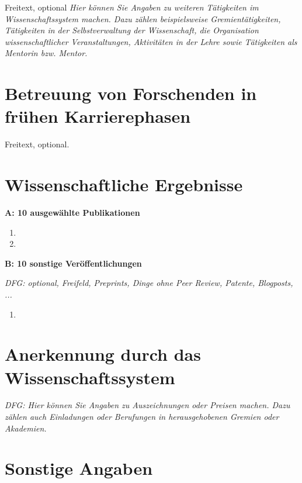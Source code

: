 \documentclass[a4paper,11pt]{article}
\begin{document}
Freitext, optional
\emph{Hier können Sie Angaben zu weiteren Tätigkeiten im
  Wissenschaftssystem machen. Dazu zählen beispielsweise
  Gremientätigkeiten, Tätigkeiten in der Selbstverwaltung der
  Wissenschaft, die Organisation wissenschaftlicher Veranstaltungen,
  Aktivitäten in der Lehre sowie Tätigkeiten als Mentorin
  bzw. Mentor.}

\section*{Betreuung von Forschenden in frühen Karrierephasen}%

Freitext, optional.

\section*{Wissenschaftliche Ergebnisse}

\textbf{A: 10 ausgewählte Publikationen}



\begin{enumerate}
  \item {}
  \item {}
\end{enumerate}

\textbf{B: 10 sonstige Veröffentlichungen}

\emph{DFG: optional, Freifeld, Preprints, Dinge ohne Peer Review, Patente, Blogposts, ...}

\begin{enumerate}
  \item {}
\end{enumerate}

\section*{Anerkennung durch das Wissenschaftssystem}

\emph{DFG: Hier können Sie Angaben zu Auszeichnungen oder Preisen
  machen. Dazu zählen auch Einladungen oder Berufungen in
  herausgehobenen Gremien oder Akademien.  }

\section*{Sonstige Angaben}
\end{document}
